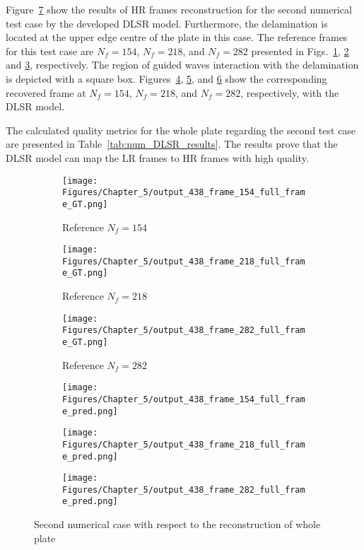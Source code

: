 Figure~\ref{fig:num_results_CS_438} show the results of HR frames reconstruction for the second numerical test case by the developed DLSR model.
Furthermore, the delamination is located at the upper edge centre of the plate in this case.
The reference frames for this test case are $N_f=154$, $N_f=218$, and $N_f=282$ presented in Figs.~\ref{fig:ref_438_full_154}, \ref{fig:ref_438_full_218} and \ref{fig:ref_438_full_282}, respectively.
The region of guided waves interaction with the delamination is depicted with a square box.
Figures~\ref{fig:pred_438_full_154}, \ref{fig:pred_438_full_218}, and \ref{fig:pred_438_full_282} show the corresponding recovered frame at $N_f=154$, $N_f=218$, and $N_f=282$, respectively, with the DLSR model.

The calculated quality metrics for the whole plate regarding the second test case are presented in Table~\ref{tab:num_DLSR_results}.
The results prove that the DLSR model can map the LR frames to HR frames with high quality.
\begin{figure} [!ht]
	\centering
	\begin{subfigure}[b]{.32\textwidth}
		\centering
		\texttt{[image: Figures/Chapter\_5/output\_438\_frame\_154\_full\_frame\_GT.png]}
		\caption{Reference $N_f=154$}
		\label{fig:ref_438_full_154}
	\end{subfigure}
	\begin{subfigure}[b]{.32\textwidth}
		\centering
		\texttt{[image: Figures/Chapter\_5/output\_438\_frame\_218\_full\_frame\_GT.png]}
		\caption{Reference $N_f=218$}
		\label{fig:ref_438_full_218}
	\end{subfigure}
	\begin{subfigure}[b]{.32\textwidth}
		\centering
		\texttt{[image: Figures/Chapter\_5/output\_438\_frame\_282\_full\_frame\_GT.png]}
		\caption{Reference $N_f=282$}
		\label{fig:ref_438_full_282}	
	\end{subfigure}
	\begin{subfigure}[b]{.32\textwidth}
		\centering
		\texttt{[image: Figures/Chapter\_5/output\_438\_frame\_154\_full\_frame\_pred.png]}
		\caption{}
		\label{fig:pred_438_full_154}
	\end{subfigure}
	\begin{subfigure}[b]{.32\textwidth}
		\centering
		\texttt{[image: Figures/Chapter\_5/output\_438\_frame\_218\_full\_frame\_pred.png]}
		\caption{}
		\label{fig:pred_438_full_218}
	\end{subfigure}
	\begin{subfigure}[b]{.32\textwidth}
		\centering
		\texttt{[image: Figures/Chapter\_5/output\_438\_frame\_282\_full\_frame\_pred.png]}
		\caption{}
		\label{fig:pred_438_full_282}	
	\end{subfigure}
	\caption{Second numerical case with respect to the reconstruction of whole plate}
	\label{fig:num_results_CS_438}
\end{figure}

